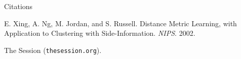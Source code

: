 \documentclass[letterpaper]{amsart}
\begin{document}
\begin{center}
\Huge
Citations
\end{center}
\huge

\begin{enumerate}[label={[\arabic*]}] \parskip=0.2in
\item
E. Xing, A. Ng, M. Jordan, and S. Russell. Distance Metric Learning, with
Application to Clustering with Side-Information. \textit{NIPS}. 2002.

\item The Session (\texttt{thesession.org}).
\end{enumerate}

\end{document}
